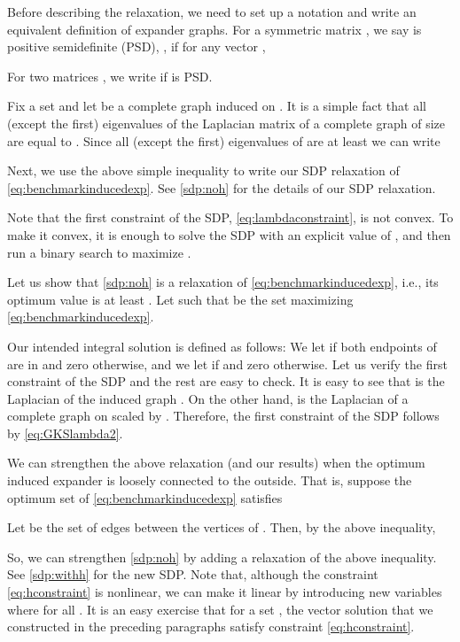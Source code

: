 \documentclass[11pt]{article}
\makeatletter
\newcommand{\setword}[2]{\phantomsection
  #1\def\@currentlabel{\unexpanded{#1}}\label{#2}}
\makeatother
\begin{document}
Before describing the relaxation, we need to set up a notation and write an equivalent definition of expander graphs.
For a symmetric matrix , we say  is positive semidefinite (PSD), , if for any vector ,

For two matrices , we write  if  is PSD. 

Fix a set  and let  be a complete graph induced on . 
It is a simple fact that all (except the first) eigenvalues of the Laplacian matrix of a complete graph of size  are equal to . 
Since all (except the first) eigenvalues of  are at least  we can write

Next,  we use the above simple inequality to write our SDP relaxation of \eqref{eq:benchmarkinducedexp}.
See \ref{sdp:noh} for the details of our SDP relaxation.
\begin{figure*}
\centering
\fbox{\parbox{5in}{ \vspace*{0mm}
\begin{center}{\bf \setword{SDP 1}{sdp:noh}}\end{center}\vspace{-.7cm}

}}
\end{figure*}
Note that the first constraint of the SDP, \eqref{eq:lambdaconstraint}, is not convex. To make it convex, it is enough to solve the SDP with an explicit value of , and then run a binary search to maximize .


Let us show that \ref{sdp:noh} is a relaxation of \eqref{eq:benchmarkinducedexp}, i.e., its optimum value is at least .
Let  such that  be the set maximizing \eqref{eq:benchmarkinducedexp}.

Our intended integral solution is defined as follows:
 We let  if both endpoints of  are in  and zero otherwise, and we let  if  and zero otherwise. 
Let us verify the first constraint of the SDP and the rest are easy to check. It is easy to see that 
 is the Laplacian of the induced graph . On the other hand, 
is the Laplacian of a complete graph  on  scaled by . 
Therefore, the first constraint of the SDP follows by \eqref{eq:GKSlambda2}.

We can strengthen the above relaxation (and our results) when the optimum induced expander is loosely connected to the outside. That is, suppose the optimum set  of \eqref{eq:benchmarkinducedexp} satisfies

Let  be the set of edges between the vertices of .
Then, by the above inequality,

So, we can strengthen \ref{sdp:noh} by adding a relaxation of the above inequality. See \ref{sdp:withh} for the new SDP. 
Note that, although the constraint \eqref{eq:hconstraint} is nonlinear, we can make it linear by introducing new variables  where   for all .
It is an easy exercise that for a set , the vector solution  that we constructed in the preceding paragraphs satisfy constraint \eqref{eq:hconstraint}.
\begin{figure*}
\centering
\fbox{\parbox{4in}{ \begin{center}{\bf \setword{SDP 2}{sdp:withh}}\end{center}\vspace{-.7cm}

}}
\end{figure*}
\end{document}
